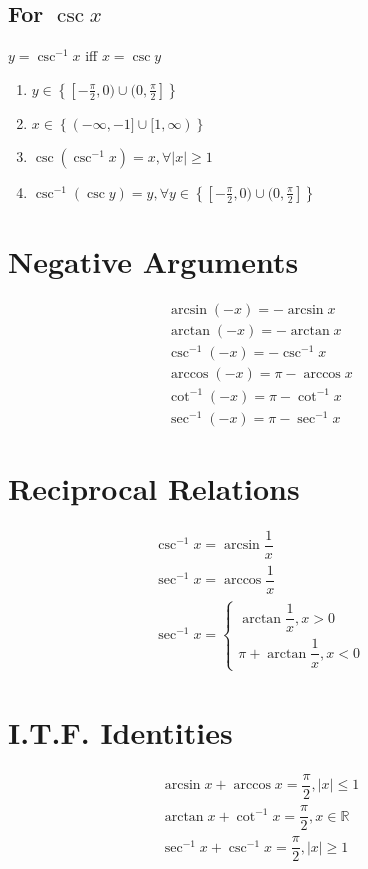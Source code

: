 \documentclass[openany, oneside]{book}
\begin{document}
\subsection{For $\csc x$}
$y=\csc^{-1} x$ iff $x=\csc y$
\begin{enumerate}
\item $y\in\left\lbrace [-\frac{\pi}{2},0)\cup(0,\frac{\pi}{2}]\right\rbrace$
\item $x\in\left\lbrace(-\infty,-1]\cup[1,\infty)\right\rbrace$
\item $\csc(\csc^{-1}x)=x,\forall \lvert x \rvert \geq 1$
\item $\csc^{-1}(\csc y)=y, \forall y \in \left\lbrace [-\frac{\pi}{2},0)\cup(0,\frac{\pi}{2}]\right\rbrace$
\end{enumerate}

\section{Negative Arguments}
\begin{align}
\arcsin (-x)=-\arcsin x\\
\arctan (-x)=-\arctan x\\
\csc^{-1} (-x)=-\csc^{-1} x\\
\arccos (-x)=\pi-\arccos x\\
\cot^{-1} (-x)=\pi-\cot^{-1} x\\
\sec^{-1} (-x)=\pi-\sec^{-1} x
\end{align}

\section{Reciprocal Relations}
\begin{align}
\csc^{-1} x=\arcsin \dfrac{1}{x}\\
\sec^{-1} x=\arccos \dfrac{1}{x}\\
\sec^{-1} x=\begin{cases}
\arctan \dfrac{1}{x}, x>0\\
\pi+\arctan \dfrac{1}{x}, x<0
\end{cases}
\end{align}

\section{I.T.F. Identities}
\begin{align}
\arcsin x+\arccos x=\dfrac{\pi}{2}, \lvert x \rvert \leq 1\\
\arctan x+\cot^{-1} x=\dfrac{\pi}{2}, x\in\mathbb{R}\\
\sec^{-1} x+\csc^{-1} x=\dfrac{\pi}{2}, \lvert x \rvert \geq 1
\end{align}
\end{document}
